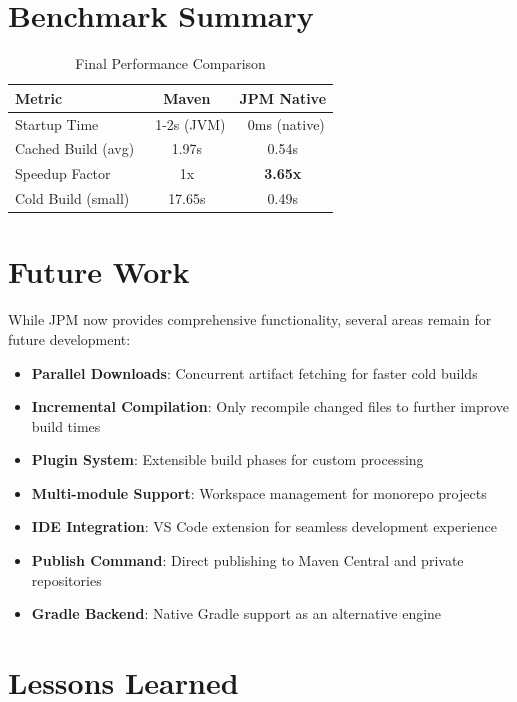 \documentclass[12pt,a4paper]{report}
\begin{document}
\section{Benchmark Summary}

\begin{table}[H]
\centering
\begin{tabular}{lcc}
\toprule
\textbf{Metric} & \textbf{Maven} & \textbf{JPM Native} \\
\midrule
Startup Time & ~1-2s (JVM) & ~0ms (native) \\
Cached Build (avg) & 1.97s & 0.54s \\
Speedup Factor & 1x & \textbf{3.65x} \\
Cold Build (small) & 17.65s & 0.49s \\
\bottomrule
\end{tabular}
\caption{Final Performance Comparison}
\end{table}

\section{Future Work}

While JPM now provides comprehensive functionality, several areas remain for future development:

\begin{itemize}
    \item \textbf{Parallel Downloads}: Concurrent artifact fetching for faster cold builds
    \item \textbf{Incremental Compilation}: Only recompile changed files to further improve build times
    \item \textbf{Plugin System}: Extensible build phases for custom processing
    \item \textbf{Multi-module Support}: Workspace management for monorepo projects
    \item \textbf{IDE Integration}: VS Code extension for seamless development experience
    \item \textbf{Publish Command}: Direct publishing to Maven Central and private repositories
    \item \textbf{Gradle Backend}: Native Gradle support as an alternative engine
\end{itemize}

\section{Lessons Learned}
\end{document}
